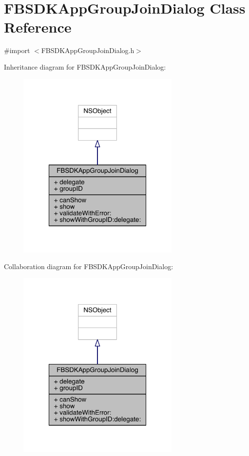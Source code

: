 \hypertarget{interface_f_b_s_d_k_app_group_join_dialog}{\section{F\-B\-S\-D\-K\-App\-Group\-Join\-Dialog Class Reference}
\label{interface_f_b_s_d_k_app_group_join_dialog}
}


{\ttfamily \#import $<$F\-B\-S\-D\-K\-App\-Group\-Join\-Dialog.\-h$>$}



Inheritance diagram for F\-B\-S\-D\-K\-App\-Group\-Join\-Dialog\-:
\nopagebreak
\begin{figure}[H]
\begin{center}
\leavevmode
\includegraphics[width=228pt]{interface_f_b_s_d_k_app_group_join_dialog__inherit__graph}
\end{center}
\end{figure}


Collaboration diagram for F\-B\-S\-D\-K\-App\-Group\-Join\-Dialog\-:
\nopagebreak
\begin{figure}[H]
\begin{center}
\leavevmode
\includegraphics[width=228pt]{interface_f_b_s_d_k_app_group_join_dialog__coll__graph}
\end{center}
\end{figure}

